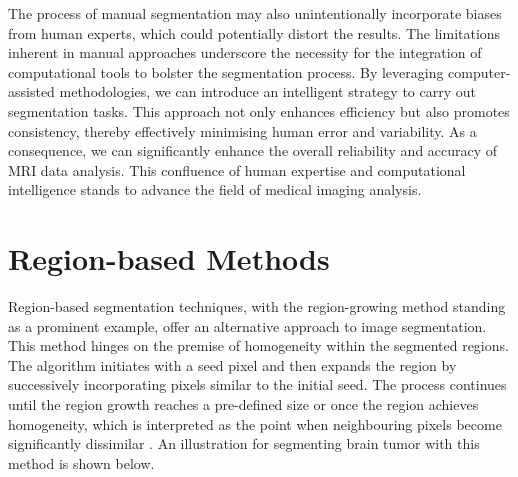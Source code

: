 The process of manual segmentation may also unintentionally incorporate biases from human experts, which could potentially distort the results. The limitations inherent in manual approaches underscore the necessity for the integration of computational tools to bolster the segmentation process. By leveraging computer-assisted methodologies, we can introduce an intelligent strategy to carry out segmentation tasks. This approach not only enhances efficiency but also promotes consistency, thereby effectively minimising human error and variability. As a consequence, we can significantly enhance the overall reliability and accuracy of MRI data analysis. This confluence of human expertise and computational intelligence stands to advance the field of medical imaging analysis.

\section{Region-based Methods}
Region-based segmentation techniques, with the region-growing method standing as a prominent example, offer an alternative approach to image segmentation. This method hinges on the premise of homogeneity within the segmented regions. The algorithm initiates with a seed pixel and then expands the region by successively incorporating pixels similar to the initial seed. The process continues until the region growth reaches a pre-defined size or once the region achieves homogeneity, which is interpreted as the point when neighbouring pixels become significantly dissimilar \cite{adams1994seeded}. An illustration for segmenting brain tumor with this method \cite{biratu2021enhanced} is shown below. 

